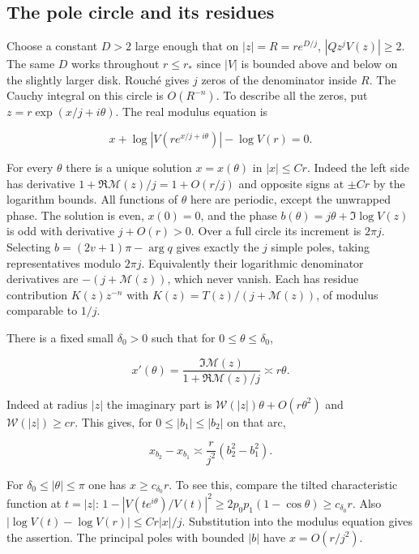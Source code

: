 \documentclass[11pt]{article}
\begin{document}
\subsection{The pole circle and its residues}
\label{sec:the-pole-circle-and-its-residues}

Choose a constant \(D>2\) large enough that on \(|z|=R=r e^{D/j}\), \(|Qz^j V(z)|\ge2\). The same \(D\) works throughout \(r\le r_*\) since \(|V|\) is bounded above and below on the slightly larger disk. Rouché gives \(j\) zeros of the denominator inside \(R\). The Cauchy integral on this circle is \(O(R^{-n})\). To describe all the zeros, put \(z=r\exp(x/j+i\theta)\). The real modulus equation is

\begin{equation*}
x+\log|V(r e^{x/j+i\theta})|-\log V(r)=0 .
\end{equation*}

For every \(\theta\) there is a unique solution \(x=x(\theta)\) in \(|x|\le C r\). Indeed the left side has derivative \(1+\Re\mathcal M(z)/j=1+O(r/j)\) and opposite signs at \(\pm C r\) by the logarithm bounds. All functions of \(\theta\) here are periodic, except the unwrapped phase. The solution is even, \(x(0)=0\), and the phase \(b(\theta)=j\theta+\Im\log V(z)\) is odd with derivative \(j+O(r)>0\). Over a full circle its increment is \(2\pi j\). Selecting \(b=(2v+1)\pi-\arg q\) gives exactly the \(j\) simple poles, taking representatives modulo \(2\pi j\). Equivalently their logarithmic denominator derivatives are \(-(j+\mathcal M(z))\), which never vanish. Each has residue contribution \(K(z)z^{-n}\) with \(K(z)=T(z)/(j+\mathcal M(z))\), of modulus comparable to \(1/j\).

There is a fixed small \(\delta_0>0\) such that for \(0\le\theta\le\delta_0\),

\begin{equation*}
x'(\theta)=\frac{\Im\mathcal M(z)}{1+\Re\mathcal M(z)/j}\asymp r\theta.
\end{equation*}

Indeed at radius \(|z|\) the imaginary part is \(\mathcal W(|z|)\theta+O(r\theta^2)\) and \(\mathcal W(|z|)\ge cr\). This gives, for \(0\le |b_1|\le |b_2|\) on that arc,

\begin{equation*}
x_{b_2}-x_{b_1}\asymp\frac r{j^2}(b_2^2-b_1^2).
\end{equation*}

For \(\delta_0\le|\theta|\le\pi\) one has \(x\ge c_{\delta_0}r\). To see this, compare the tilted characteristic function at \(t=|z|\): \(1-|V(t e^{i\theta})/V(t)|^2\ge 2p_0p_1(1-\cos\theta)\ge c_{\delta_0}r\). Also \(|\log V(t)-\log V(r)|\le C r |x|/j\). Substitution into the modulus equation gives the assertion. The principal poles with bounded \(|b|\) have \(x=O(r/j^2)\).
\end{document}
